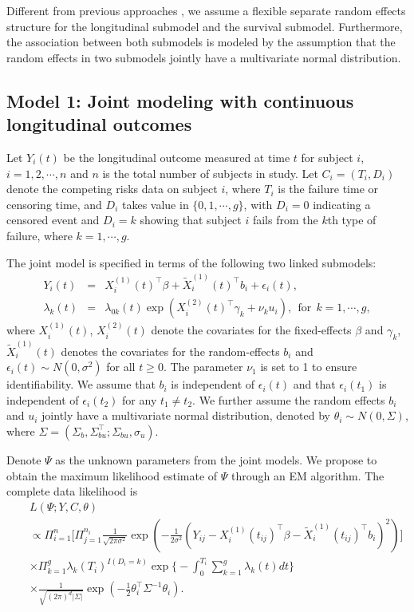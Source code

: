  Different from previous approaches \citep{rizopoulos2012joint,williamson2008joint}, we assume a flexible separate random effects structure for the longitudinal submodel and the survival submodel. Furthermore, the association between both submodels is modeled by the assumption that the random effects in two submodels jointly have a multivariate normal distribution.

\subsection{Model 1: Joint modeling with continuous longitudinal outcomes}

Let $Y_i(t)$ be the longitudinal outcome measured at time $t$ for subject $i$, $i=1,2,\cdots,n$ and $n$ is the total number of subjects in study. Let $C_i=(T_i,D_i)$ denote the competing risks data on subject $i$, where $T_i$ is the failure time or censoring time, and $D_i$ takes value in $\{0,1,\cdots,g\}$, with $D_i=0$ indicating a censored event and $D_i=k$ showing that subject $i$ fails from the $k$th type of failure, where $k=1,\cdots,g$.

The joint model is specified in terms of the following two linked submodels:
\begin{eqnarray*}
Y_i(t)&=&X_i^{(1)}(t)^\top \beta+\tilde X_i^{(1)}(t)^\top b_i+\epsilon_i(t),\\
\lambda_k(t)&=&\lambda_{0k}(t)\exp(X_i^{(2)}(t)^\top \gamma_k+\nu_k u_i),~~\mbox{for}~~k=1,\cdots,g,
\end{eqnarray*}
where $X_i^{(1)}(t)$, $X_i^{(2)}(t)$ denote the covariates for the fixed-effects $\beta$ and $\gamma_k$, $\tilde X_i^{(1)}(t)$ denotes the covariates for the random-effects $b_i$ and $\epsilon_i(t)\sim N(0,\sigma^2)$ for all $t\geq 0$. The parameter $\nu_1$ is set to 1 to ensure identifiability. We assume that $b_i$ is independent of $\epsilon_i(t)$ and that $\epsilon_i(t_1)$ is independent of $\epsilon_i(t_2)$ for any $t_1\neq t_2$. We further assume the random effects $b_i$ and $u_i$ jointly have a multivariate normal distribution, denoted by $\theta_i\sim N(0,\Sigma)$, where $\Sigma=(\Sigma_{b},\Sigma_{bu}^\top;\Sigma_{bu},\sigma_u)$.

Denote $\Psi$ as the unknown parameters from the joint models. We propose to obtain the maximum likelihood estimate of $\Psi$ through an EM algorithm. The complete data likelihood is
\begin{eqnarray*}
&&L(\Psi;Y,C,\theta)\\
&&\propto \Pi_{i=1}^n\Big[\Pi_{j=1}^{n_i}\frac{1}{\sqrt{2\pi\sigma^2}}\exp(-\frac{1}{2\sigma^2}(Y_{ij}-X_i^{(1)}(t_{ij})^\top\beta-\tilde X_i^{(1)}(t_{ij})^\top b_i)^2)\Big]\\
&&\times \Pi_{k=1}^g\lambda_k(T_i)^{I(D_i=k)}\exp\Big\{-\int_0^{T_i}\sum_{k=1}^g\lambda_k(t)dt\Big\}\\
&&\times \frac{1}{\sqrt{(2\pi)^d|\Sigma|}}\exp(-\frac{1}{2}\theta_i^\top\Sigma^{-1}\theta_i).
\end{eqnarray*}

